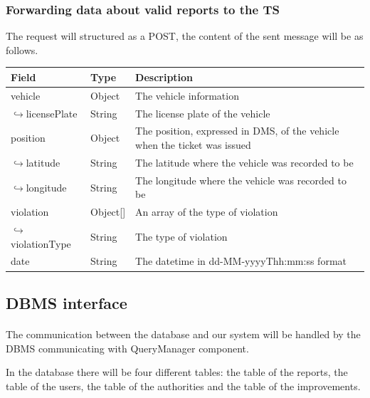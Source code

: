 					\subsubsection{Forwarding data about valid reports to the TS}
						The request will structured as a POST, the content of the sent message will be as follows.
						\begin{table}[!h]
						\begin{tabular}{L{0.3\textwidth}L{0.15\textwidth}L{0.43\textwidth}}
							\toprule
							\textbf{Field} & \textbf{Type} & \textbf{Description} \\
							\midrule
							vehicle & Object & The vehicle information \\
							\hspace{2.5mm}$\hookrightarrow$licensePlate & String & The license plate of the vehicle \\
							position & Object & The position, expressed in DMS, of the vehicle when the ticket was issued  \\
							\hspace{2.5mm}$\hookrightarrow$latitude & String & The latitude where the vehicle was recorded to be \\
							\hspace{2.5mm}$\hookrightarrow$longitude & String & The longitude where the vehicle was recorded to be \\
							violation & Object[] & An array of the type of violation \\
							\hspace{2.5mm}$\hookrightarrow$violationType & String & The type of violation \\
							date & String & The datetime in \newline dd-MM-yyyyThh:mm:ss format \\
								 	\bottomrule
								\end{tabular}
							\end{table}
			\subsection{DBMS interface}
				\paragraph{}
					The communication between the database and our system will be handled by the DBMS communicating with QueryManager component. 
					
					In the database there will be four different tables: the table of the reports, the table of the users, the table of the authorities and the table of the improvements.
				
